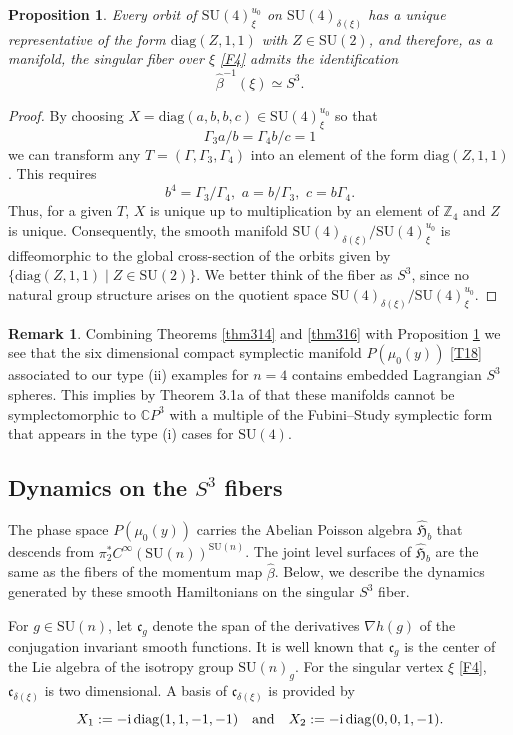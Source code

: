 \documentclass[a4paper,11pt,reqno]{amsart}
\newtheorem{prop}[thm]{Proposition}
\theoremstyle{definition}
\newtheorem{rem}[thm]{Remark}
\numberwithin{equation}{section}
\newcommand{\be}{\begin{equation}}
\newcommand{\ee}{\end{equation}}
\def\ri{{\mathrm{i}}}                       %
\def\bC{{\mathbb C}}                        %
\def\bZ{{\mathbb Z}}                        %
\def\diag{\mathrm{diag}}                    %
\def\SU{\mathrm{SU}}                        %
\def\fH{{\mathfrak{H}}}                     %
\def\fc{{\mathfrak c}}                      %
\begin{document}
\begin{prop}\label{prop42}
Every orbit of $\SU(4)_\xi^{u_0}$ on $\SU(4)_{\delta(\xi)}$ has a unique representative of the form
$\diag(Z,1,1)$ with $Z\in \SU(2)$, and therefore, as a manifold, the singular fiber over $\xi$ \eqref{F4}  admits the identification
\be
\hat \beta^{-1}(\xi) \simeq S^3.
\ee
\end{prop}
\begin{proof}
By choosing $X=\diag(a,b,b,c)\in \SU(4)_\xi^{u_0}$ so that
\be
\Gamma_3 a/b= \Gamma_4 b/c = 1
\ee
we  can transform any $T=(\Gamma, \Gamma_3, \Gamma_4)$ into an element of the form $\diag(Z,1,1)$.
This requires
\be
b^4 = \Gamma_3/\Gamma_4,\,\, a = b/\Gamma_3,\,\, c = b\Gamma_4.
\ee
Thus, for a given $T$,  $X$ is unique up to multiplication by an element of $\bZ_4$ and $Z$ is unique.
Consequently,  the smooth manifold $\SU(4)_{\delta(\xi)}/\SU(4)_\xi^{u_0}$ is
 diffeomorphic to the global cross-section of the orbits given by
 $\{ \diag(Z,1,1)\mid Z\in \SU(2)\}$.
We better think of the fiber as $S^3$, since no natural group structure arises on the quotient space $\SU(4)_{\delta(\xi)}/\SU(4)_\xi^{u_0}$.
\end{proof}

\begin{rem}\label{remSeid}
Combining Theorems \ref{thm314} and \ref{thm316} with Proposition \ref{prop42} we see that the six dimensional compact
symplectic manifold $P(\mu_0(y))$  \eqref{T18} associated to our type (ii) examples for $n=4$ contains embedded Lagrangian $S^3$ spheres.
This implies by Theorem 3.1a of \cite{S} that these manifolds cannot be symplectomorphic to $\bC P^3$ with
a multiple of the Fubini--Study symplectic
form that appears \cite{FKlim,FK} in the type (i) cases for $\SU(4)$.
\end{rem}


\subsection{Dynamics on the $S^3$ fibers }\label{Sec43}

The phase space $P(\mu_0(y))$ carries the Abelian Poisson algebra $\hat \fH_b$ that descends from
$\pi_2^*C^\infty(\SU(n))^{\SU(n)}$. The joint level surfaces of $\hat \fH_b$ are the same as the
fibers of the momentum map $\hat \beta$. Below, we describe the dynamics generated by  these smooth Hamiltonians
on the singular $S^3$ fiber.

For $g\in \SU(n)$, let $\fc_g$ denote the span of the derivatives $\nabla h(g)$ of the conjugation invariant smooth functions.
It is well known that $\fc_g$ is  the center of the Lie algebra of the isotropy group  $\SU(n)_g$.
For the singular vertex $\xi$ \eqref{F4}, $\fc_{\delta(\xi)}$ is two dimensional.
A basis of  $\fc_{\delta(\xi)}$ is provided by
\be
X_1:= -\ri\, \diag(1,1,-1,-1) \quad\hbox{and}\quad X_2 := -\ri\, \diag(0,0,1,-1).
\label{425}\ee
\end{document}

